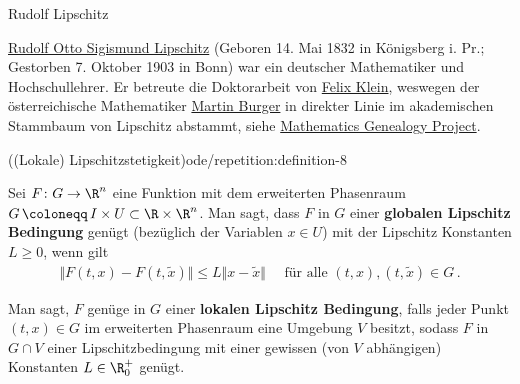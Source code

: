 \documentclass[letterpaper,10pt,english]{jupyterBook}
\begin{document}
\begin{emphBox}{Rudolf Lipschitz}{}

\par
\href{https://de.wikipedia.org/wiki/Rudolf\_Lipschitz}{Rudolf Otto Sigismund Lipschitz} (Geboren 14. Mai 1832 in Königsberg i. Pr.; Gestorben 7. Oktober 1903 in Bonn) war ein deutscher Mathematiker und Hochschullehrer. Er betreute die Doktorarbeit von \href{https://en.wikipedia.org/wiki/Felix\_Klein}{Felix Klein}, weswegen der österreichische Mathematiker \href{https://www.math.fau.de/angewandte-mathematik-1/mitarbeiter/prof-dr-martin-burger/}{Martin Burger} in direkter Linie im akademischen Stammbaum von Lipschitz abstammt, siehe \href{https://genealogy.math.ndsu.nodak.edu/index.php}{Mathematics Genealogy Project}.
\end{emphBox}
\begin{definition}{((Lokale) Lipschitzstetigkeit)}{ode/repetition:definition-8}



\par
Sei \(F \colon G \to \R^n\) eine Funktion mit dem erweiterten Phasenraum \(G \, \coloneqq \, I \times U \subset \R\times\R^n\).
Man sagt, dass \(F\) in \(G\) einer \textbf{globalen Lipschitz Bedingung} genügt (bezüglich der Variablen \(x \in U\)) mit der Lipschitz Konstanten \(L\geq0\), wenn gilt
\begin{align*}
\Vert F(t,x) - F(t,\widetilde{x}) \Vert \leq L \Vert x-\widetilde{x}\Vert\quad\text{ für alle }(t,x), (t,\widetilde{x})\in G\,.
\end{align*}
\par
Man sagt, \(F\) genüge in \(G\) einer \textbf{lokalen Lipschitz Bedingung}, falls jeder Punkt \((t,x)\in G\) im erweiterten Phasenraum eine Umgebung \(V\) besitzt, sodass \(F\) in \(G\cap V\) einer Lipschitzbedingung mit einer gewissen (von \(V\) abhängigen) Konstanten \(L\in\R_0^+\) genügt.
\end{definition}
\end{document}
